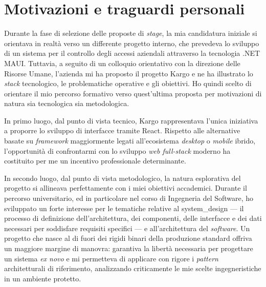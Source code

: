 \section{Motivazioni e traguardi personali}
\label{sec:motivazioni_scelta}

Durante la fase di selezione delle proposte di \textit{stage}, la mia candidatura iniziale si orientava in realtà verso un differente progetto interno, che prevedeva lo sviluppo di un sistema per il controllo degli accessi aziendali attraverso la tecnologia .NET MAUI. Tuttavia, a seguito di un colloquio orientativo con la direzione delle Risorse Umane, l'azienda mi ha proposto il progetto Kargo e ne ha illustrato lo \textit{stack} tecnologico, le problematiche operative e gli obiettivi. Ho quindi scelto di orientare il mio percorso formativo verso quest'ultima proposta per motivazioni di natura sia tecnologica sia metodologica.

In primo luogo, dal punto di vista tecnico, Kargo rappresentava l'unica iniziativa a proporre lo sviluppo di interfacce tramite React. Rispetto alle alternative basate su \textit{framework} maggiormente legati all'ecosistema \textit{desktop} o \textit{mobile} ibrido, l'opportunità di confrontarmi con lo sviluppo \textit{web full-stack} moderno ha costituito per me un incentivo professionale determinante. 

In secondo luogo, dal punto di vista metodologico, la natura esplorativa del progetto si allineava perfettamente con i miei obiettivi accademici. Durante il percorso universitario, ed in particolare nel corso di Ingegneria del Software, ho sviluppato un forte interesse per le tematiche relative al \gls{system_design} --- il processo di definizione dell'architettura, dei componenti, delle interfacce e dei dati necessari per soddisfare requisiti specifici --- e all'architettura del \textit{software}. Un progetto che nasce al di fuori dei rigidi binari della produzione standard offriva un maggiore margine di manovra: garantiva la libertà necessaria per progettare un sistema \textit{ex novo} e mi permetteva di applicare con rigore i \textit{pattern} architetturali di riferimento, analizzando criticamente le mie scelte ingegneristiche in un ambiente protetto.

